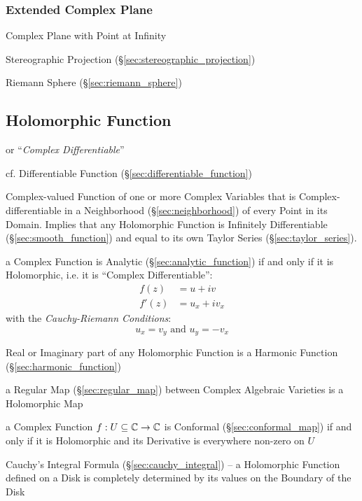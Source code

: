\subsubsection{Extended Complex Plane}\label{sec:extended_complex_plane}

Complex Plane with Point at Infinity

Stereographic Projection (\S\ref{sec:stereographic_projection})

Riemann Sphere (\S\ref{sec:riemann_sphere})



\subsection{Holomorphic Function}\label{sec:holomorphic_function}

or ``\emph{Complex Differentiable}''

cf. Differentiable Function (\S\ref{sec:differentiable_function})

Complex-valued Function of one or more Complex Variables that is
Complex-differentiable in a Neighborhood (\S\ref{sec:neighborhood}) of
every Point in its Domain. Implies that any Holomorphic Function is
Infinitely Differentiable (\S\ref{sec:smooth_function}) and equal to
its own Taylor Series (\S\ref{sec:taylor_series}).

a Complex Function is Analytic (\S\ref{sec:analytic_function}) if and only if
it is Holomorphic, i.e. it is ``Complex Differentiable'':
\begin{align*}
  f(z)  & = u + iv \\
  f'(z) & = u_x + iv_x
\end{align*}
with the \emph{Cauchy-Riemann Conditions}:
\[
  u_x = v_y \text{ and } u_y = - v_x
\]

Real or Imaginary part of any Holomorphic Function is a Harmonic
Function (\S\ref{sec:harmonic_function})

a Regular Map (\S\ref{sec:regular_map}) between Complex Algebraic Varieties is
a Holomorphic Map

a Complex Function $f : U \subseteq \mathbb{C} \to \mathbb{C}$ is Conformal
(\S\ref{sec:conformal_map}) if and only if it is Holomorphic and its Derivative
is everywhere non-zero on $U$

Cauchy's Integral Formula (\S\ref{sec:cauchy_integral}) -- a Holomorphic
Function defined on a Disk is completely determined by its values on the
Boundary of the Disk

